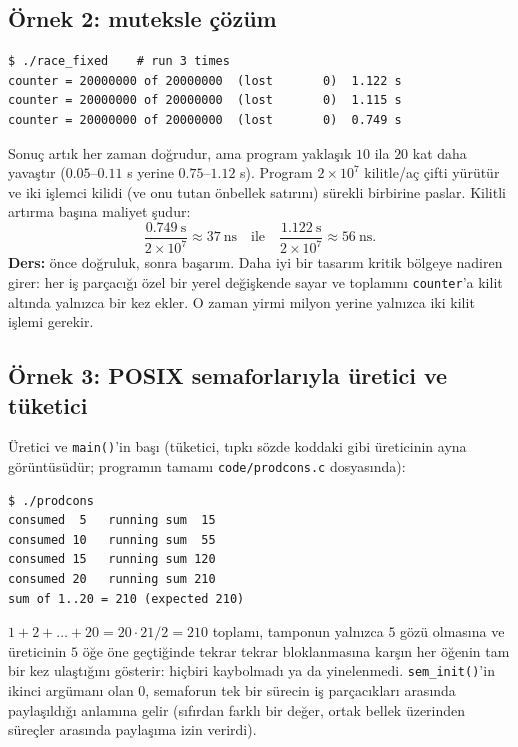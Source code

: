 \documentclass[11pt,a4paper]{article}
\newcommand{\cmd}[1]{\texttt{#1}}
\begin{document}
\subsection{Örnek 2: muteksle çözüm}



\begin{lstlisting}[style=term]
$ ./race_fixed    # run 3 times
counter = 20000000 of 20000000  (lost       0)  1.122 s
counter = 20000000 of 20000000  (lost       0)  1.115 s
counter = 20000000 of 20000000  (lost       0)  0.749 s
\end{lstlisting}

Sonuç artık her zaman doğrudur, ama program yaklaşık $10$ ila $20$ kat daha yavaştır ($0.05$--$0.11$ s yerine $0.75$--$1.12$ s). Program $2\times10^{7}$ kilitle/aç çifti yürütür ve iki işlemci kilidi (ve onu tutan önbellek satırını) sürekli birbirine paslar. Kilitli artırma başına maliyet şudur:
\[
\frac{0.749\ \text{s}}{2\times10^{7}} \approx 37\ \text{ns} \quad\text{ile}\quad \frac{1.122\ \text{s}}{2\times10^{7}} \approx 56\ \text{ns}.
\]
\textbf{Ders:} önce doğruluk, sonra başarım. Daha iyi bir tasarım kritik bölgeye nadiren girer: her iş parçacığı özel bir yerel değişkende sayar ve toplamını \texttt{counter}'a kilit altında yalnızca bir kez ekler. O zaman yirmi milyon yerine yalnızca iki kilit işlemi gerekir.

\subsection{Örnek 3: POSIX semaforlarıyla üretici ve tüketici}
\label{sec:prodcons}

Üretici ve \texttt{main()}'in başı (tüketici, tıpkı sözde koddaki gibi üreticinin ayna görüntüsüdür; programın tamamı \texttt{code/prodcons.c} dosyasında):


\begin{lstlisting}[style=term]
$ ./prodcons
consumed  5   running sum  15
consumed 10   running sum  55
consumed 15   running sum 120
consumed 20   running sum 210
sum of 1..20 = 210 (expected 210)
\end{lstlisting}

$1+2+\dots+20 = 20\cdot21/2 = 210$ toplamı, tamponun yalnızca $5$ gözü olmasına ve üreticinin $5$ öğe öne geçtiğinde tekrar tekrar bloklanmasına karşın her öğenin tam bir kez ulaştığını gösterir: hiçbiri kaybolmadı ya da yinelenmedi. \cmd{sem\_init()}'in ikinci argümanı olan $0$, semaforun tek bir sürecin iş parçacıkları arasında paylaşıldığı anlamına gelir (sıfırdan farklı bir değer, ortak bellek üzerinden süreçler arasında paylaşıma izin verirdi).
\end{document}
